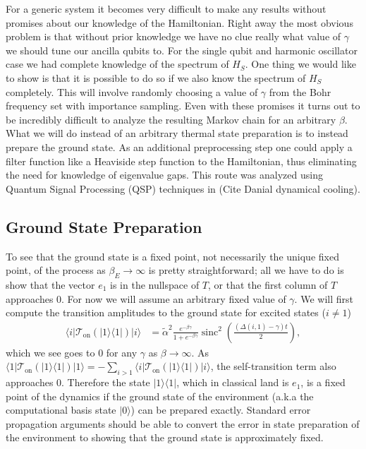 \documentclass{article}
\newcommand{\on}{\text{on}}
\newcommand{\ket}[1]{|#1\rangle}
\newcommand{\bra}[1]{\langle #1|}
\newcommand{\ketbra}[2]{| #1\rangle\! \langle #2|}
\DeclareMathOperator{\sinc}{sinc}
\begin{document}
 
For a generic system it becomes very difficult to make any results without promises about our knowledge of the Hamiltonian. Right away the most obvious problem is that without prior knowledge we have no clue really what value of $\gamma$ we should tune our ancilla qubits to. For the single qubit and harmonic oscillator case we had complete knowledge of the spectrum of $H_S$. One thing we would like to show is that it is possible to do so if we also know the spectrum of $H_S$ completely. This will involve randomly choosing a value of $\gamma$ from the Bohr frequency set with importance sampling. Even with these promises it turns out to be incredibly difficult to analyze the resulting Markov chain for an arbitrary $\beta$. What we will do instead of an arbitrary thermal state preparation is to instead prepare the ground state. As an additional preprocessing step one could apply a filter function like a Heaviside step function to the Hamiltonian, thus eliminating the need for knowledge of eigenvalue gaps. This route was analyzed using Quantum Signal Processing (QSP) techniques in (Cite Danial dynamical cooling). 


\subsection{Ground State Preparation}

To see that the ground state is a fixed point, not necessarily the unique fixed point, of the process as $\beta_E \to \infty$ is pretty straightforward; all we have to do is show that the vector $e_1$ is in the nullspace of $T$, or that the first column of $T$ approaches 0. For now we will assume an arbitrary fixed value of $\gamma$. We will first compute the transition amplitudes to the ground state for excited states ($i \neq 1$)
\begin{align}
    \bra{i} \mathcal{T}_{\on}(\ketbra{1}{1} ) \ket{i} &= \widetilde{\alpha}^2 \frac{e^{-\beta \gamma}}{1 + e^{-\beta \gamma}} \sinc^2\left(\frac{(\Delta(i, 1) - \gamma)t}{2} \right),
\end{align}
which we see goes to 0 for any $\gamma$ as $\beta \to \infty$. As $\bra{1}\mathcal{T}_{\on}(\ketbra{1}{1}) \ket{1} = - \sum_{i > 1} \bra{i} \mathcal{T}_{\on}(\ketbra{1}{1} ) \ket{i}$, the self-transition term also approaches 0. Therefore the state $\ketbra{1}{1}$, which in classical land is $e_1$, is a fixed point of the dynamics if the ground state of the environment (a.k.a the computational basis state $\ket{0}$) can be prepared exactly. Standard error propagation arguments should be able to convert the error in state preparation of the environment to showing that the ground state is approximately fixed. 
\end{document}
